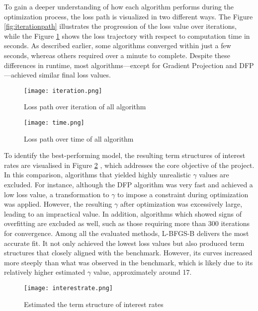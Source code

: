 \documentclass[12pt]{article}
\begin{document}
\clearpage
To gain a deeper understanding of how each algorithm performs during the optimization process, the loss path is visualized in two different ways. The Figure \ref{fig:iterationpath} illustrates the progression of the loss value over iterations, while the Figure \ref{fig:timepath} shows the loss trajectory with respect to computation time in seconds.
 As described earlier, some algorithms converged within just a few seconds, whereas others required over a minute to complete. Despite these differences in runtime, most algorithms—except for Gradient Projection and DFP—achieved similar final loss values.

\begin{figure}[ht]
  \centering
  \begin{minipage}[t]{0.48\linewidth}
    \centering
    \texttt{[image: iteration.png]}
    \caption{Loss path over iteration of all algorithm}
    \label{fig:iterationpath}
\end{minipage}
  \hspace{0.02\linewidth}
  \begin{minipage}[t]{0.48\linewidth}
    \centering

    \texttt{[image: time.png]}
    \caption{Loss path over time of all algorithm}
    \label{fig:timepath}
  \end{minipage}
\end{figure}
To identify the best-performing model, the resulting term structures of interest rates are visualised in Figure \ref{fig:interest rate} , which addresses the core objective of the project. In this comparison, algorithms that yielded highly unrealistic $\gamma$ values are excluded. For instance, although the DFP algorithm was very fast and achieved a low loss value, a transformation to $\gamma$ to impose a constraint during optimization was applied. However, the resulting $\gamma$ after optimization was excessively large, leading to an impractical value. In addition, algorithms which showed signs of overfitting are excluded as well, such as those requiring more than 300 iterations for convergence.
Among all the evaluated methods, L-BFGS-B delivers the most accurate fit. It not only achieved the lowest loss values but also produced term structures that closely aligned with the benchmark. However, its curves increased more steeply than what was observed in the benchmark, which is likely due to its relatively higher estimated $\gamma$ value, approximately around 17.
\begin{figure}[H]
    \centering
    \texttt{[image: interestrate.png]}
    \caption{Estimated the term structure of interest rates}
    \label{fig:interest rate}
\end{figure}
\end{document}
